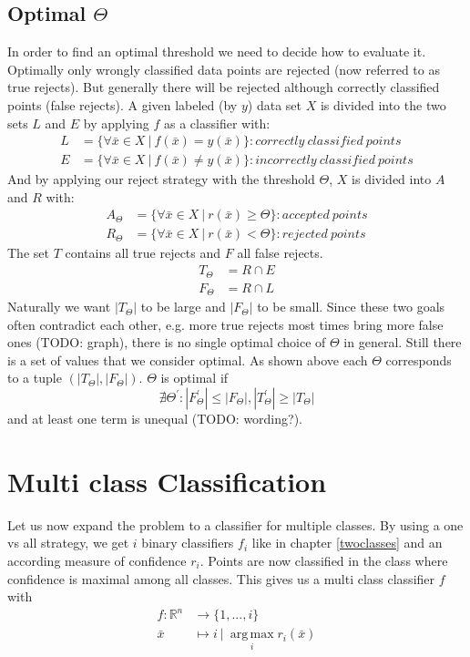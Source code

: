 \subsection{Optimal $\Theta$}
In order to find an optimal threshold we need to decide how to evaluate it. Optimally only wrongly classified data points are rejected (now referred to as true rejects). But generally there will be rejected although correctly classified points (false rejects). 
A given labeled (by $y$) data set $X$ is divided into the two sets $L$ and $E$ by applying $f$ as a classifier with:
\begin{align} 
L&=\{\forall \bar{x} \in X \ | \ f(\bar{x}) = y(\bar{x})\} : correctly \ classified \ points \\
E&=\{\forall \bar{x} \in X \ | \ f(\bar{x}) \neq y(\bar{x})\} : incorrectly \ classified \ points \end{align}
And by applying our reject strategy with the threshold $\Theta$, $X$ is divided into $A$ and $R$ with:
\begin{align} 
A_\Theta&=\{\forall \bar{x} \in X \ | \ r(\bar{x}) \geq \Theta \} : accepted \ points \\
R_\Theta&=\{\forall \bar{x} \in X \ | \ r(\bar{x}) < \Theta\} : rejected \ points 
\end{align}
The set $T$ contains all true rejects and $F$ all false rejects.
\begin{align} 
T_\Theta &= R \cap E \\ 
F_\Theta &= R \cap L
\end{align}
Naturally we want $|T_\Theta|$ to be large and $|F_\Theta|$ to be small. Since these two goals often contradict each other, e.g. more true rejects most times bring more false ones (TODO: graph), there is no single optimal choice of $\Theta$ in general. Still there is a set of values that we consider optimal. As shown above each $\Theta$ corresponds to a tuple $(|T_\Theta|,|F_\Theta|)$. $\Theta$ is optimal if
$$ \nexists \Theta^{'} : |F_\Theta^{'}|\leq|F_\Theta|, |T_\Theta^{'}|\geq|T_\Theta| $$ and at least one term is unequal (TODO: wording?). 


\section{Multi class Classification}
Let us now expand the problem to a classifier for multiple classes.
By using a one vs all strategy, we get $i$ binary classifiers $f_i$ like in chapter \ref{twoclasses} and an according measure of confidence $r_i$. Points are now classified in the class where confidence is maximal among all classes. This gives us a multi class classifier $f$ with
\begin{align}
 f: \mathbb{R}^n &\to \{1,...,i\} \\
   \bar{x} &\mapsto i \ | \ \operatorname*{arg\,max}_i r_i(\bar{x}) 
\end{align}

